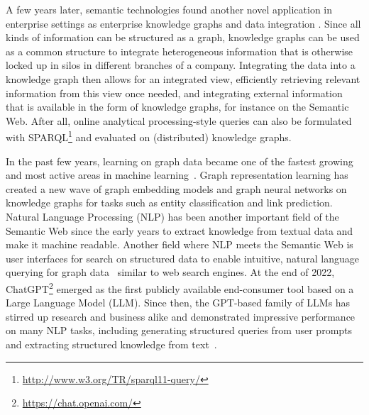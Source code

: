\documentclass[a4paper,USenglish]{tgdk-v2021}
\begin{document}
A few years later, semantic technologies found another novel application in enterprise settings as enterprise knowledge graphs \cite{DBLP:conf/iceis/GalkinAVS17,Noy19} and data integration \cite{Cheatham2017,DBLP:books/sp/10/Wood10}. 
Since all kinds of information can be structured as a graph, knowledge graphs can be used as a common structure to integrate heterogeneous information that is otherwise locked up in silos in different branches of a company.
Integrating the data into a knowledge graph then allows for an integrated view, efficiently retrieving relevant information from this view once needed, and integrating external information that is available in the form of knowledge graphs, for instance on the Semantic Web. 
After all, online analytical processing-style queries can also be formulated with SPARQL\footnote{\url{http://www.w3.org/TR/sparql11-query/}} and evaluated on (distributed) knowledge graphs.

In the past few years, learning on graph data became one of the fastest growing and most active areas in machine learning~\cite{DBLP:series/synthesis/2020Hamilton}.
Graph representation learning has created a new wave of graph embedding models and graph neural networks on knowledge graphs for tasks such as entity classification and link prediction.
Natural Language Processing (NLP) has been another important field of the Semantic Web since the early years to extract knowledge from textual data and make it machine readable. 
Another field where NLP meets the Semantic Web is user interfaces for search on structured data to enable intuitive, natural language querying for graph data~\cite{DBLP:journals/eswa/HabernalK13} similar to web search engines.
At the end of 2022, ChatGPT\footnote{\url{https://chat.openai.com/}} emerged as the first publicly available end-consumer tool based on a Large Language Model (LLM).
Since then, the GPT-based family of LLMs has stirred up research and business alike and demonstrated impressive performance on many NLP tasks, including generating structured queries from user prompts and extracting structured knowledge from text~\cite{DBLP:journals/corr/abs-2305-04676}.
\end{document}
